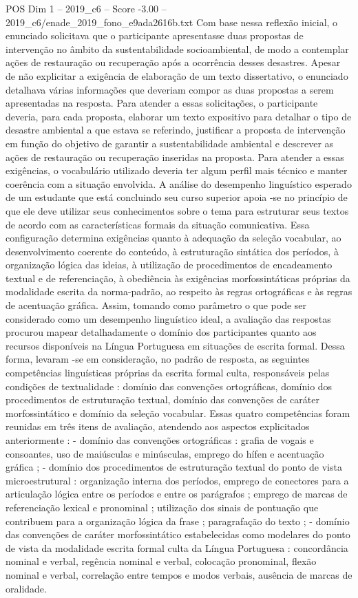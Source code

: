 \begin{textsample}{POS Dim 1 – 2019\_c6 – Score -3.00 – 2019\_c6/enade\_2019\_fono\_e9ada2616b.txt}
Com base nessa reflexão inicial, o enunciado solicitava que o participante apresentasse duas propostas de intervenção no âmbito da sustentabilidade socioambiental, de modo a contemplar ações de restauração ou recuperação após a ocorrência desses desastres.
Apesar de não explicitar a exigência de elaboração de um texto dissertativo, o enunciado detalhava várias informações que deveriam compor as duas propostas a serem apresentadas na resposta.
Para atender a essas solicitações, o participante deveria, para cada proposta, elaborar um texto expositivo para detalhar o tipo de desastre ambiental a que estava se referindo, justificar a proposta de intervenção em função do objetivo de garantir a sustentabilidade ambiental e descrever as ações de restauração ou recuperação inseridas na proposta.
Para atender a essas exigências, o vocabulário utilizado deveria ter algum perfil mais técnico e manter coerência com a situação envolvida.
A análise do desempenho linguístico esperado de um estudante que está concluindo seu curso superior apoia -se no princípio de que ele deve utilizar seus conhecimentos sobre o tema para estruturar seus textos de acordo com as características formais da situação comunicativa.
Essa configuração determina exigências quanto à adequação da seleção vocabular, ao desenvolvimento coerente do conteúdo, à estruturação sintática dos períodos, à organização lógica das ideias, à utilização de procedimentos de encadeamento textual e de referenciação, à obediência às exigências morfossintáticas próprias da modalidade escrita da norma-padrão, ao respeito às regras ortográficas e às regras de acentuação gráfica.
Assim, tomando como parâmetro o que pode ser considerado como um desempenho linguístico ideal, a avaliação das respostas procurou mapear detalhadamente o domínio dos participantes quanto aos recursos disponíveis na Língua Portuguesa em situações de escrita formal.
Dessa forma, levaram -se em consideração, no padrão de resposta, as seguintes competências linguísticas próprias da escrita formal culta, responsáveis pelas condições de textualidade : domínio das convenções ortográficas, domínio dos procedimentos de estruturação textual, domínio das convenções de caráter morfossintático e domínio da seleção vocabular.
Essas quatro competências foram reunidas em três itens de avaliação, atendendo aos aspectos explicitados anteriormente : - domínio das convenções ortográficas : grafia de vogais e consoantes, uso de maiúsculas e minúsculas, emprego do hífen e acentuação gráfica ; - domínio dos procedimentos de estruturação textual do ponto de vista microestrutural : organização interna dos períodos, emprego de conectores para a articulação lógica entre os períodos e entre os parágrafos ; emprego de marcas de referenciação lexical e pronominal ; utilização dos sinais de pontuação que contribuem para a organização lógica da frase ; paragrafação do texto ; - domínio das convenções de caráter morfossintático estabelecidas como modelares do ponto de vista da modalidade escrita formal culta da Língua Portuguesa : concordância nominal e verbal, regência nominal e verbal, colocação pronominal, flexão nominal e verbal, correlação entre tempos e modos verbais, ausência de marcas de oralidade.

\end{textsample}
